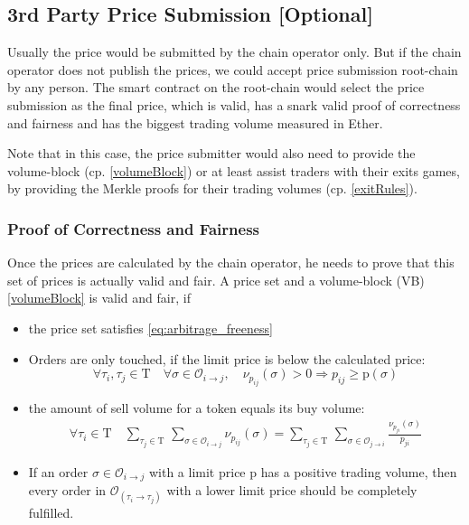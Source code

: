 \documentclass[11pt,parskip=full]{scrartcl}%
\newcommand{\Tau}{\mathrm{T}}
\def\pO{\mathcal{O}}
\def\ra{\rightarrow}
\begin{document}
\subsection*{3rd Party Price Submission [Optional]}
\label{publicPrices}
Usually the price would be submitted by the chain operator only. 
But if the chain operator does not publish the prices, we could accept price submission root-chain by any person. 
The smart contract on the root-chain would select the price submission as the final price, which is valid, has a snark valid proof of correctness and fairness and has the biggest trading volume measured in Ether. 

Note that in this case, the price submitter would also need to provide the volume-block (cp. \ref{volumeBlock}) or at least assist traders with their exits games, by providing the Merkle proofs for their trading volumes (cp. \ref{exitRules}). 

\subsubsection{Proof of Correctness and Fairness}
\label{proofprices}
Once the prices are calculated by the chain operator, he needs to prove that this set of prices is actually valid and fair. A price set and a volume-block (VB) \ref{volumeBlock} is valid and fair, if

\begin{itemize}

\item the price set satisfies \ref{eq:arbitrage_freeness} 
\item Orders are only touched, if the limit price is below the calculated price:\newline
\begin{equation} \forall \tau_i ,\tau_j \in \Tau \quad \forall \sigma \in \pO_{i\ra j}, \quad \nu_{p_{ij}}(\sigma)>0 \Rightarrow p_{ij}\geq \text{p}(\sigma)
\end{equation}
\item the amount of sell volume for a token equals its buy volume: 
\begin{equation}
\begin{split}
\forall \tau_i \in \Tau \quad \sum_{\tau_j\in \Tau} \,
\sum_{ \sigma\in \pO_{i \rightarrow j}} \nu_{p_{ij}}(\sigma) = \sum_{\tau_j\in \Tau} \, \sum_{\sigma\in \pO_{j\rightarrow i}} \frac{\nu_{p_{ji}}(\sigma)}{p_{ji}}
\end{split}
\end{equation}
\item If an order $\sigma \in \pO_{i\rightarrow j}$ with a limit price p has a positive trading volume, then every order in $\pO_{(\tau_i\rightarrow \tau_j)}$ with a lower limit price should be completely fulfilled. 
\end{itemize}
\end{document}

